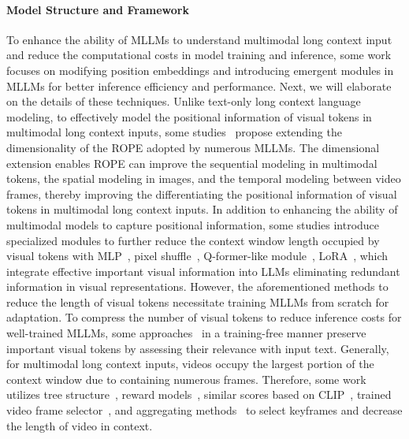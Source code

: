 \documentclass[11pt, a4paper, logo, copyright, nonumbering]{map}
\begin{document}
\paragraph{Model Structure and Framework} To enhance the ability of MLLMs to understand multimodal long context input and reduce the computational costs in model training and inference, some work focuses on modifying position embeddings and introducing emergent modules in MLLMs for better inference efficiency and performance. Next, we will elaborate on the details of these techniques. Unlike text-only long context language modeling, to effectively model the positional information of visual tokens in multimodal long context inputs, some studies~\citep{Qwen2VL,ge-2024-arxiv-v2pe,su-kexuefm-2024-ropetie} propose extending the dimensionality of the ROPE adopted by numerous MLLMs. The dimensional extension enables ROPE can improve the sequential modeling in multimodal tokens, the spatial modeling in images, and the temporal modeling between video frames, thereby improving the differentiating the positional information of visual tokens in multimodal long context inputs. In addition to enhancing the ability of multimodal models to capture positional information, some studies introduce specialized modules to further reduce the context window length occupied by visual tokens with MLP~\citep{Qwen2VL}, pixel shuffle~\citep{chen-arxiv-2024-internvl15}, Q-former-like module~\citep{Alayrac-2022-nips-flamingo,li-2023-icml-blip2,zhu-2024-arxiv-focusllava,ye-2024-arxiv-mPLUG-Owl3}, LoRA~\citep{ma-2024-arxiv-vlora}, which integrate effective important visual information into LLMs eliminating redundant information in visual representations. However, the aforementioned methods to reduce the length of visual tokens necessitate training MLLMs from scratch for adaptation. To compress the number of visual tokens to reduce inference costs for well-trained MLLMs, some approaches~\citep{liu-2024-arxiv-mustdrop,han-2024-arixv-ficoco,yang-2024-arxiv-visionzip,vasu-2024-arxiv-fastvlm} in a training-free manner preserve important visual tokens by assessing their relevance with input text. Generally, for multimodal long context inputs, videos occupy the largest portion of the context window due to containing numerous frames. Therefore, some work utilizes tree structure~\citep{wang-2024-arxiv-videotree}, reward models~\citep{yang-2024-arxiv-vca}, similar scores based on CLIP~\citep{liang-2024-arxiv-keyvideollm}, trained video frame selector~\citep{yu-2024-arxiv-framevoyager,hannan-2024-arxiv-revisionllm}, and aggregating methods~\citep{faure-2024-arxiv-hermes} to select keyframes and decrease the length of video in context.
\end{document}
